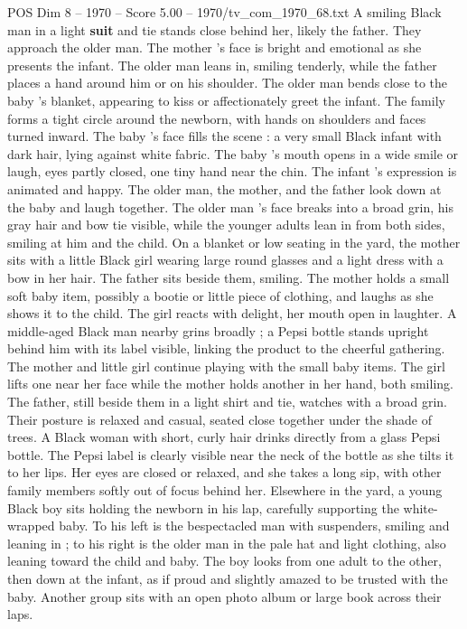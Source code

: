 \begin{textsample}{POS Dim 8 – 1970 – Score 5.00 – 1970/tv\_com\_1970\_68.txt}
A smiling Black man in a light \textbf{suit} and tie stands close behind her, likely the father.
They approach the older man.
The mother ’s face is bright and emotional as she presents the infant.
The older man leans in, smiling tenderly, while the father places a hand around him or on his shoulder.
The older man bends close to the baby ’s blanket, appearing to kiss or affectionately greet the infant.
The family forms a tight circle around the newborn, with hands on shoulders and faces turned inward.
The baby ’s face fills the scene : a very small Black infant with dark hair, lying against white fabric.
The baby ’s mouth opens in a wide smile or laugh, eyes partly closed, one tiny hand near the chin.
The infant ’s expression is animated and happy.
The older man, the mother, and the father look down at the baby and laugh together.
The older man ’s face breaks into a broad grin, his gray hair and bow tie visible, while the younger adults lean in from both sides, smiling at him and the child.
On a blanket or low seating in the yard, the mother sits with a little Black girl wearing large round glasses and a light dress with a bow in her hair.
The father sits beside them, smiling.
The mother holds a small soft baby item, possibly a bootie or little piece of clothing, and laughs as she shows it to the child.
The girl reacts with delight, her mouth open in laughter.
A middle-aged Black man nearby grins broadly ; a Pepsi bottle stands upright behind him with its label visible, linking the product to the cheerful gathering.
The mother and little girl continue playing with the small baby items.
The girl lifts one near her face while the mother holds another in her hand, both smiling.
The father, still beside them in a light shirt and tie, watches with a broad grin.
Their posture is relaxed and casual, seated close together under the shade of trees.
A Black woman with short, curly hair drinks directly from a glass Pepsi bottle.
The Pepsi label is clearly visible near the neck of the bottle as she tilts it to her lips.
Her eyes are closed or relaxed, and she takes a long sip, with other family members softly out of focus behind her.
Elsewhere in the yard, a young Black boy sits holding the newborn in his lap, carefully supporting the white-wrapped baby.
To his left is the bespectacled man with suspenders, smiling and leaning in ; to his right is the older man in the pale hat and light clothing, also leaning toward the child and baby.
The boy looks from one adult to the other, then down at the infant, as if proud and slightly amazed to be trusted with the baby.
Another group sits with an open photo album or large book across their laps.

\end{textsample}
